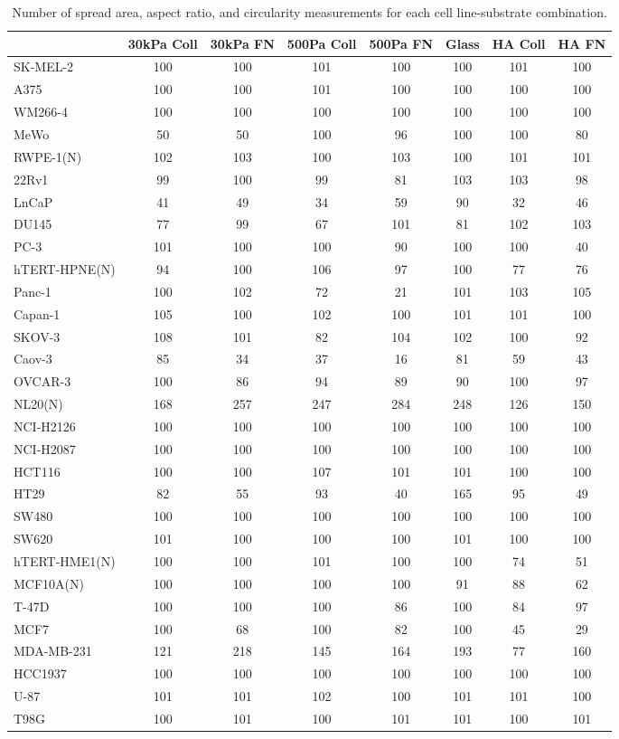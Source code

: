 \begin{table}[!h]
\centering
\caption{\label{tab:count-area}Number of spread area, aspect ratio, and circularity measurements for each cell line-substrate combination.}
\centering
\begin{tabular}[t]{lccccccc}
\toprule
  & 30kPa Coll & 30kPa FN & 500Pa Coll & 500Pa FN & Glass & HA Coll & HA FN\\
\midrule
SK-MEL-2 & 100 & 100 & 101 & 100 & 100 & 101 & 100\\
A375 & 100 & 100 & 101 & 100 & 100 & 100 & 100\\
WM266-4 & 100 & 100 & 100 & 100 & 100 & 100 & 100\\
MeWo & 50 & 50 & 100 & 96 & 100 & 100 & 80\\
RWPE-1(N) & 102 & 103 & 100 & 103 & 100 & 101 & 101\\
22Rv1 & 99 & 100 & 99 & 81 & 103 & 103 & 98\\
LnCaP & 41 & 49 & 34 & 59 & 90 & 32 & 46\\
DU145 & 77 & 99 & 67 & 101 & 81 & 102 & 103\\
PC-3 & 101 & 100 & 100 & 90 & 100 & 100 & 40\\
hTERT-HPNE(N) & 94 & 100 & 106 & 97 & 100 & 77 & 76\\
Panc-1 & 100 & 102 & 72 & 21 & 101 & 103 & 105\\
Capan-1 & 105 & 100 & 102 & 100 & 101 & 101 & 100\\
SKOV-3 & 108 & 101 & 82 & 104 & 102 & 100 & 92\\
Caov-3 & 85 & 34 & 37 & 16 & 81 & 59 & 43\\
OVCAR-3 & 100 & 86 & 94 & 89 & 90 & 100 & 97\\
NL20(N) & 168 & 257 & 247 & 284 & 248 & 126 & 150\\
NCI-H2126 & 100 & 100 & 100 & 100 & 100 & 100 & 100\\
NCI-H2087 & 100 & 100 & 100 & 100 & 100 & 100 & 100\\
HCT116 & 100 & 100 & 107 & 101 & 101 & 100 & 100\\
HT29 & 82 & 55 & 93 & 40 & 165 & 95 & 49\\
SW480 & 100 & 100 & 100 & 100 & 100 & 100 & 100\\
SW620 & 101 & 100 & 100 & 100 & 101 & 100 & 100\\
hTERT-HME1(N) & 100 & 100 & 101 & 100 & 100 & 74 & 51\\
MCF10A(N) & 100 & 100 & 100 & 100 & 91 & 88 & 62\\
T-47D & 100 & 100 & 100 & 86 & 100 & 84 & 97\\
MCF7 & 100 & 68 & 100 & 82 & 100 & 45 & 29\\
MDA-MB-231 & 121 & 218 & 145 & 164 & 193 & 77 & 160\\
HCC1937 & 100 & 100 & 100 & 100 & 100 & 100 & 100\\
U-87 & 101 & 101 & 102 & 100 & 101 & 101 & 100\\
T98G & 100 & 101 & 100 & 101 & 101 & 100 & 101\\
\bottomrule
\end{tabular}
\end{table}
